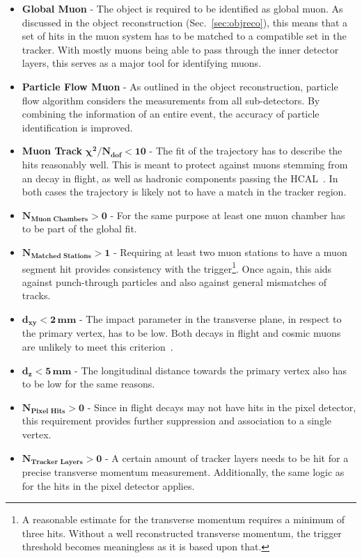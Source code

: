\begin{itemize}
\item \textbf{Global Muon} - The object is required to be identified as global muon. As discussed in the object reconstruction (Sec.~\ref{sec:objreco}), this means that a set of hits in the muon system has to be matched to a compatible set in the tracker. With mostly muons being able to pass through the inner detector layers, this serves as a major tool for identifying muons.
\item \textbf{Particle Flow Muon} - As outlined in the object reconstruction, particle flow algorithm considers the measurements from all sub-detectors. By combining the information of an entire event, the accuracy of particle identification is improved.
\item \textbf{Muon Track} $\mathbf{\chi^2 / N_{\textbf{dof}} < 10}$ - The fit of the trajectory has to describe the hits reasonably well. This is meant to protect against muons stemming from an decay in flight, as well as hadronic components passing the HCAL~\cite{muonidcosmic}. In both cases the trajectory is likely not to have a match in the tracker region.
\item $\mathbf{N_{\textbf{Muon Chambers}} > 0}$ - For the same purpose at least one muon chamber has to be part of the global fit. 
\item $\mathbf{N_{\textbf{Matched Stations}} > 1}$ - Requiring at least two muon stations to have a muon segment hit provides consistency with the trigger\footnote{A reasonable estimate for the transverse momentum requires a minimum of three hits. Without a well reconstructed transverse momentum, the trigger threshold becomes meaningless as it is based upon that.}. Once again, this aids against punch-through particles and also against general mismatches of tracks.
\item $\mathbf{d_{xy} < 2\,\textbf{mm}}$ - The impact parameter in the transverse plane, in respect to the primary vertex, has to be low. Both decays in flight and cosmic muons are unlikely to meet this criterion~\cite{muonidcosmic}.
\item $\mathbf{d_z < 5\,\textbf{mm}}$ - The longitudinal distance towards the primary vertex also has to be low for the same reasons.
\item $\mathbf{N_{\textbf{Pixel Hits}} > 0}$ - Since in flight decays may not have hits in the pixel detector, this requirement provides further suppression and association to a single vertex.
\item $\mathbf{N_{\textbf{Tracker Layers}} > 0}$ - A certain amount of tracker layers needs to be hit for a precise transverse momentum measurement. Additionally, the same logic as for the hits in the pixel detector applies.
\end{itemize}

